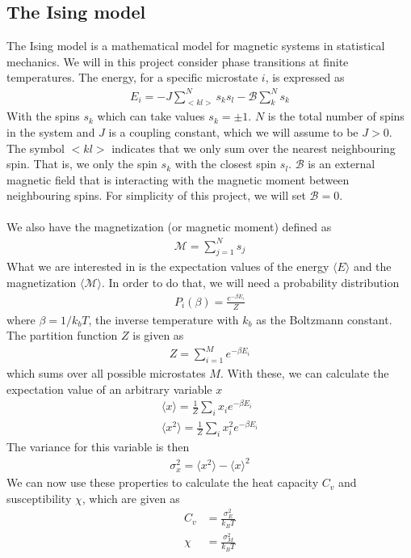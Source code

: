 \documentclass[12pt]{article}
\begin{document}
\subsection{The Ising model}
The Ising model is a mathematical model for magnetic systems in statistical mechanics. We will in this project consider phase transitions at finite temperatures. The energy, for a specific microstate $i$, is expressed as
\begin{align}
E_i = -J \displaystyle \sum^N_{< kl >}s_ks_l - \mathcal{B}\sum^N_k s_k
\label{eq:Energy_eq}
\end{align}
With the spins $s_k$ which can take values $s_k = \pm 1$. $N$ is the total number of spins in the system and $J$ is a coupling constant, which we will assume to be $J>0$. The symbol $< kl >$ indicates that we only sum over the nearest neighbouring spin. That is, we only the spin $s_k$ with the closest spin $s_l$. $\mathcal{B}$ is an external magnetic field that is interacting with the magnetic moment between neighbouring spins. For simplicity of this project, we will set $\mathcal{B} = 0$.\\\\
We also have the magnetization (or magnetic moment) defined as
\begin{align}
\mathcal{M} = \displaystyle \sum^N_{j=1} s_j
\label{eq:Magnetization}
\end{align}
What we are interested in is the expectation values of the energy $\langle E \rangle$ and the magnetization $\langle \mathcal{M} \rangle$. In order to do that, we will need a probability distribution
\begin{align}
P_i(\beta) = \frac{e^{-\beta E_i}}{Z}
\label{eq:Probability_dist}
\end{align}
where $\beta = 1/k_bT$, the inverse temperature with $k_b$ as the Boltzmann constant. The partition function $Z$ is given as
\begin{align}
Z = \displaystyle \sum_{i=1}^M e^{-\beta E_i}
\label{eq:Partition_func}
\end{align}
which sums over all possible microstates $M$. With these, we can calculate the expectation value of an arbitrary variable $x$
\begin{align*}
\langle x \rangle = \frac{1}{Z}\sum_i x_i e^{-\beta E_i} \\
\langle x^2 \rangle = \frac{1}{Z}\sum_i x_i^2 e^{-\beta E_i}
\end{align*} 
The variance for this variable is then
\begin{align*}
\sigma_x^2 = \langle x^2 \rangle - \langle x \rangle^2
\end{align*}
We can now use these properties to calculate the heat capacity $C_v$ and susceptibility $\chi$, which are given as
\begin{align*}
C_v &= \frac{\sigma_E^2}{k_BT} \\
\chi &= \frac{\sigma_M^2}{k_BT}
\end{align*}
\end{document}
